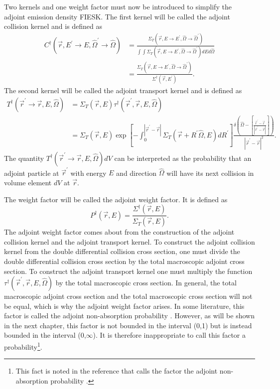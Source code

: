 Two kernels and one weight factor must now be introduced to simplify
the adjoint emission density FIESK. The first kernel will be called the 
adjoint collision kernel and is defined as
\begin{align}
  C^{\dagger}(\vec{r},E^{'} \to E,\hat{\Omega}^{'} \to \hat{\Omega}) & = 
  \frac{\Sigma_T(\vec{r},E \to E^{'},\hat{\Omega} \to \hat{\Omega}^{'})}
  {\int\int \Sigma_T(\vec{r},E \to E^{'},\hat{\Omega} \to \hat{\Omega}^{'})
    dE d\hat{\Omega}} \nonumber \\
  & = \frac{\Sigma_T(\vec{r},E \to E^{'},\hat{\Omega} \to \hat{\Omega}^{'})}
           {\Sigma^{\dagger}(\vec{r},E^{'})}.
  \label{eq:adj_collision_kernel}
\end{align}
The second kernel will be called the adjoint transport kernel and is defined as
\begin{align}
  T^{\dagger}(\vec{r}^{'} \to \vec{r},E,\hat{\Omega}) & = 
  \Sigma_T(\vec{r},E) \tau^{\dagger}(\vec{r}^{'},\vec{r},E,\hat{\Omega})
  \nonumber \\
  & = \Sigma_T(\vec{r},E) \exp{\left[-\int_0^{|\vec{r}^{'} - \vec{r}|} 
      \Sigma_T(\vec{r}+R^{'}\hat{\Omega},E)dR^{'} \right]}
    \frac{\delta \left(\hat{\Omega} - \left[\frac{\vec{r}^{'} - \vec{r}}
        {|\vec{r}^{'} - \vec{r}|}\right]\right)}
    {|\vec{r}^{'} - \vec{r}|^2}.
\end{align}
The quantity $T^{\dagger}(\vec{r}^{'} \to \vec{r},E,\hat{\Omega})dV$ can be
interpreted as the probability that an adjoint particle at $\vec{r}^{'}$ with
energy $E$ and direction $\hat{\Omega}$ will have its next collision in volume
element $dV$ at $\vec{r}$.

The weight factor will be called the adjoint weight factor. It is defined as
\begin{equation}
  P^{\dagger}(\vec{r},E) = \frac{\Sigma^{\dagger}(\vec{r},E)}
  {\Sigma_T(\vec{r},E)}.
\end{equation}
The adjoint weight factor comes about from the construction of the adjoint
collision kernel and the adjoint transport kernel. To construct the adjoint
collision kernel from the double differential collision cross section, one
must divide the double differential collision cross section by the total
macroscopic adjoint cross section. To construct the adjoint transport kernel
one must multiply the function 
$\tau^{\dagger}(\vec{r}^{'},\vec{r},E,\hat{\Omega})$ by the total macroscopic
cross section. In general, the total macroscopic adjoint cross section
and the total macroscopic cross section will not be equal, which is why the
adjoint weight factor arises. In some literature, this factor is called 
the adjoint non-absorption probability \citep{gabler_amos_2006}. However, as 
will be shown in the next chapter, this factor is not bounded in the 
interval (0,1) but is instead bounded in the interval (0,$\infty$). It is 
therefore inappropriate to call this factor a probability\footnote{This fact is
noted in the reference that calls the factor the adjoint non-absorption 
probability \citep{gabler_amos_2006}.}.

